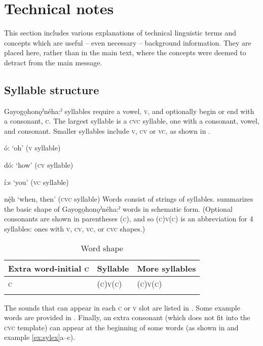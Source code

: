 \chapter{Technical notes}\label{ch:technical notes}
This section includes various explanations of technical linguistic terms and concepts which are useful -- even necessary -- background information. They are placed here, rather than in the main text, where the concepts were deemed to detract from the main message.

\section{Syllable structure} \label{syllable.structure}
Gayogo̱honǫˀnéha:ˀ syllables require a vowel, \textsc{v}, and optionally begin or end with a consonant, \textsc{c}. The largest syllable is a \textsc{cvc} syllable, one with a consonant, vowel, and consonant. Smaller syllables include \textsc{v}, \textsc{cv} or \textsc{vc}, as shown in . 

\ea\label{ex:1syl} 
\ea ó: ‘oh’ (\textsc{v} syllable)

\ex dó: ‘how’ (\textsc{cv} syllable)

\ex í:s ‘you’ (\textsc{vc} syllable)

\ex nę́h ‘when, then’ (\textsc{cvc} syllable)
\z
\z
Words consist of strings of syllables.  summarizes the basic shape of  Gayogo̱honǫˀnéha:ˀ words in schematic form. (Optional consonants are shown in parentheses \textsc{(c)}, and so \textsc{(c)v(c)} is an abbreviation for 4 syllables: ones with \textsc{v}, \textsc{cv}, \textsc{vc}, or \textsc{cvc} shapes.)


\begin{table}
\caption{Word shape}
\label{figtab:1:wordshape}
\begin{tabular}{lll}
\lsptoprule
Extra word-initial \textsc{c} & Syllable & More syllables\\\midrule
\textsc{c} & \textsc{(c)v(c)} & \textsc{(c)v(c)}\\
\lspbottomrule
\end{tabular}
\end{table}

The sounds that can appear in each \textsc{c} or \textsc{v} slot are listed in . Some example words are provided in . Finally, an extra consonant (which does not fit into the \textsc{cvc} template) can appear at the beginning of some words (as shown in  and example \ref{ex:sylex}a–c).

